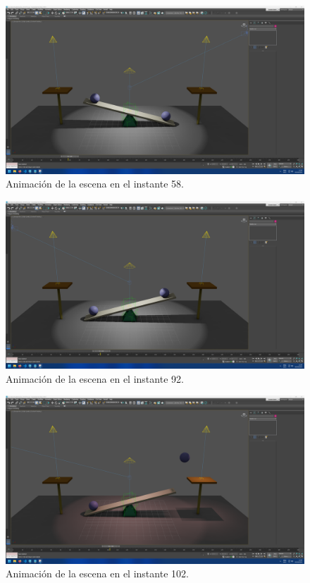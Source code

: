 \documentclass{article}
\begin{document}
 \begin{figure}[H]
    \centering
    \includegraphics[width=\textwidth]{imagenes/animaciones/general/58.png}
    \caption{Animación de la escena en el instante 58.}
 \end{figure}

 \begin{figure}[H]
    \centering
    \includegraphics[width=\textwidth]{imagenes/animaciones/general/92.png}
    \caption{Animación de la escena en el instante 92.}
 \end{figure}

 \begin{figure}[H]
    \centering
    \includegraphics[width=\textwidth]{imagenes/animaciones/general/102.png}
    \caption{Animación de la escena en el instante 102.}
 \end{figure}
\end{document}
